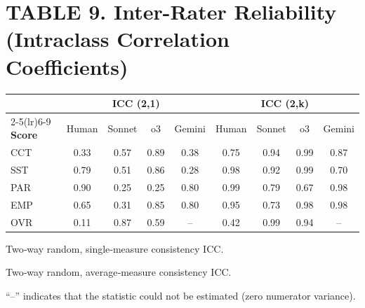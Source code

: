 \documentclass{wiley-article}
\begin{document}
\begin{table}[H] %
  \section*{TABLE 9. Inter-Rater Reliability (Intraclass Correlation Coefficients)}
  \centering
  \footnotesize
  \setlength{\tabcolsep}{4pt}
  \begin{threeparttable}
    \label{tab:icc}
    \begin{tabular}{l cccc cccc}
      \toprule
      & \multicolumn{4}{c}{\textbf{ICC (2,1)\tnote{a}}} &
        \multicolumn{4}{c}{\textbf{ICC (2,k)\tnote{b}}} \\
      \cmidrule(lr){2-5}\cmidrule(lr){6-9}
      \textbf{Score} & Human & Sonnet & o3 & Gemini &
                     Human & Sonnet & o3 & Gemini \\[2pt]
      \midrule
      CCT & 0.33 & 0.57 & 0.89 & 0.38 & 0.75 & 0.94 & 0.99 & 0.87 \\
      SST & 0.79 & 0.51 & 0.86 & 0.28 & 0.98 & 0.92 & 0.99 & 0.70 \\
      PAR & 0.90 & 0.25 & 0.25 & 0.80 & 0.99 & 0.79 & 0.67 & 0.98 \\
      EMP & 0.65 & 0.31 & 0.85 & 0.80 & 0.95 & 0.73 & 0.98 & 0.98 \\
      OVR & 0.11 & 0.87 & 0.59 & --   & 0.42 & 0.99 & 0.94 & --   \\
      \bottomrule
    \end{tabular}
    \begin{tablenotes}
      \scriptsize
      \item[a] Two‐way random, single‐measure consistency ICC.
      \item[b] Two‐way random, average‐measure consistency ICC.
      \item   “--” indicates that the statistic could not be estimated (zero numerator variance).
    \end{tablenotes}
  \end{threeparttable}
\end{table}



% 
\end{document}
